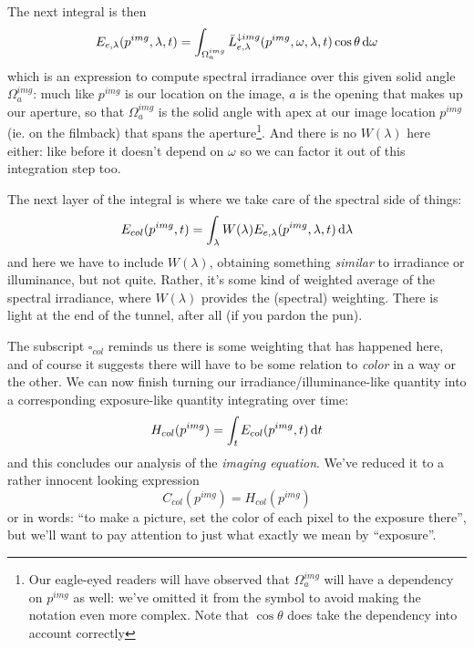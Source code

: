 The next integral is then 
\begin{displaymath}
	E_{e,\lambda}(p^{img},\lambda,t) = \int_{\Omega^{img}_a} \bar L^{\downarrow img}_{e,\lambda}(p^{img}, \omega, \lambda, t) \cos\theta \mathop{}\!\mathrm{d}\omega
\end{displaymath}
which is an expression to compute \gls{spectral} \gls{irradiance} over this given
solid angle $\Omega^{img}_a$: much like $p^{img}$ is our location on the image, 
$a$ is the opening that makes up our aperture, so that 
$\Omega^{img}_a$ is the solid angle with apex at our image location $p^{img}$ (ie. on the filmback) 
that spans the aperture\footnote{
	Our eagle-eyed readers will have observed that $\Omega^{img}_a$ will have a dependency 
	on $p^{img}$ as well: we've omitted it from the symbol to avoid making the notation even 
	more complex. Note that $\cos\theta$ does take the dependency into account correctly}.
And there is no $W(\lambda)$ here either: like before it doesn't depend on $\omega$ so 
we can factor it out of this integration step too.

The next layer of the integral is where we take care of the \gls{spectral} side of things:
\begin{displaymath}
	E_{col}(p^{img}, t) = \int_{\lambda} W(\lambda) E_{e,\lambda}(p^{img},\lambda,t) \mathop{}\!\mathrm{d}\lambda
\end{displaymath}
and here we have to include $W(\lambda)$, obtaining something \emph{similar} to \gls{irradiance} or
\gls{illuminance}, but not quite. Rather, it's some kind of weighted average of the spectral
irradiance, where $W(\lambda)$ provides the (spectral) weighting. 
There is light at the end of the tunnel, after all (if you pardon the pun). 

The subscript $\square_{col}$ reminds us there is some weighting that has happened here, 
and of course it suggests there will have to be some relation to \emph{color} in a way or the 
other.
We can now finish turning our \gls{irradiance}/\gls{illuminance}-like quantity into 
a corresponding \gls{exposure}-like quantity integrating over time:
\begin{displaymath}
	H_{col}(p^{img}) = \int_t E_{col}(p^{img},t) \mathop{}\!\mathrm{d} t
\end{displaymath}
and this concludes our analysis of the \textsl{imaging equation}. 
We've reduced it to a rather innocent looking expression
\begin{displaymath}
 	C_{col}(p^{img}) = H_{col}(p^{img})
\end{displaymath}
or in words: ``to make a picture, set the color of each pixel to the exposure there'', 
but we'll want to pay attention to just what exactly we mean by ``exposure''.

